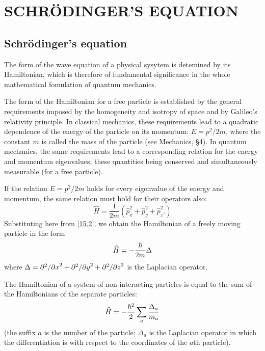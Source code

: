 \chapter{SCHR\"ODINGER'S EQUATION}
\section{Schr\"odinger's equation}\label{Schr\"odinger's equation}
The form of the wave equation of a physical sysytem is detemined by its Hamiltonian, which is therefore of fundamental significance in the whole mathematical fomulation of quantum mechanics.

The form of the Hamiltonian for a free particle is established by the general requirements imposed by the homogeneity and isotropy of space and by Galileo’s relativity principle. In classical mechanics, these requirements lead to a quadratic dependence of the energy of the particle on its momentum: $ E = p^2/2m $, where the constant $ m $ is called the mass of the particle (see Mechanics, §4). In quantum mechanics, the same requirements lead to a corresponding relation for the energy and momentum eigenvalues, these quantities being conserved and simultaneously measurable (for a free particle).

If the relation $ E = p^2/2m $ holds for every eigenvalue of the energy and momentum, the same relation must hold for their operators also:
\begin{equation}\label{17.1}
\hat{H}=\frac{1}{2m}\left(\hat{p}^2_x+\hat{p}^2_y+\hat{p}^2_z. \right)
\end{equation}
Substituting here from \eqref{15.2}, we obtain the Hamiltonian of a freely moving particle in the form
\begin{equation}\label{17.2}
\widehat{H}=-\frac{\hbar}{2m}\Delta
\end{equation}
where $ \Delta=\partial^2/{\partial x}^2+\partial^2/{\partial y}^2+\partial^2/{\partial z}^2 $ is the Laplacian operator.

The Hamiltonian of a system of non-interacting particles is equal to the sum of the Hamiltonians of the separate particles:
\begin{equation}\label{17.3}
\widehat{H}=-\frac{\hbar^2}{2}\sum_{a}\frac{\Delta_a}{m_a}
\end{equation}
(the suffix $ a $ is the number of the particle; $ \Delta_a $ is the Laplacian operator in which the differentiation is with respect to the coordinates of the $ a $th particle).


